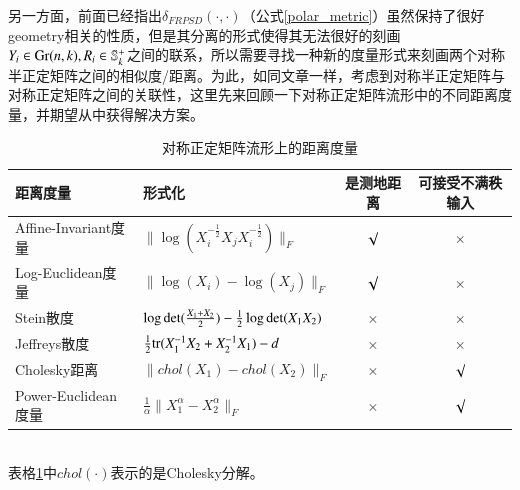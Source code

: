 另一方面，前面已经指出$\delta_{FRPSD}(\cdot,\cdot)$（公式\ref{polar_metric}）虽然保持了很好geometry相关的性质，但是其分离的形式使得其无法很好的刻画$Y_{i}\in {\rm Gr}(n,k),R_{i} \in \mathbb{S}_{k}^{+}$之间的联系，所以需要寻找一种新的度量形式来刻画两个对称半正定矩阵之间的相似度/距离。为此，如同文章\cite{PSD_Riemannian}一样，考虑到对称半正定矩阵与对称正定矩阵之间的关联性，这里先来回顾一下对称正定矩阵流形中的不同距离度量，并期望从中获得解决方案。
\begin{table}[htb]
	\centering
	\caption{对称正定矩阵流形上的距离度量}
	\begin{tabular}{llcc}
	\toprule[1.5pt]
		{\heiti 距离度量} &{\heiti 形式化} &{\heiti 是测地距离} &{\heiti 可接受不满秩输入}\\ \hline
		Affine-Invariant度量\cite{AIM_metric} &$\|\log(X_{i}^{-\frac{1}{2}}X_jX_{i}^{-\frac{1}{2}})\|_F$ &$\surd$ &$\times$ \\
		Log-Euclidean度量\cite{LEM_metric} &$\|\log(X_{i})-\log(X_{j})\|_F$ &$\surd$ &$\times$ \\
		Stein散度\cite{Stein_divergence} &$\log{\rm det}(\frac{X_1+X_2}{2})-\frac{1}{2}\log{\rm det}(X_1X_2)$ &$\times$ &$\times$ \\
		Jeffreys散度\cite{Jeffreys_divergence} &$\frac{1}{2}{\rm tr}(X_{1}^{-1}X_2+X_{2}^{-1}X_{1})-d$ &$\times$ &$\times$\\
		Cholesky距离\cite{Cholesky_distance} &$\|chol(X_1)-chol(X_2)\|_{F}$ &$\times$ &$\surd$\\
		Power-Euclidean度量\cite{Cholesky_distance} & $\frac{1}{\alpha}\|X_{1}^{\alpha}-X_{2}^{\alpha}\|_{F}$ &$\times$ &$\surd$\\
	\bottomrule[1.5pt]
	\end{tabular}
	\label{tab:SPD_metric_list}
\end{table}\\
表格\ref{tab:SPD_metric_list}中$chol(\cdot)$表示的是Cholesky分解。


